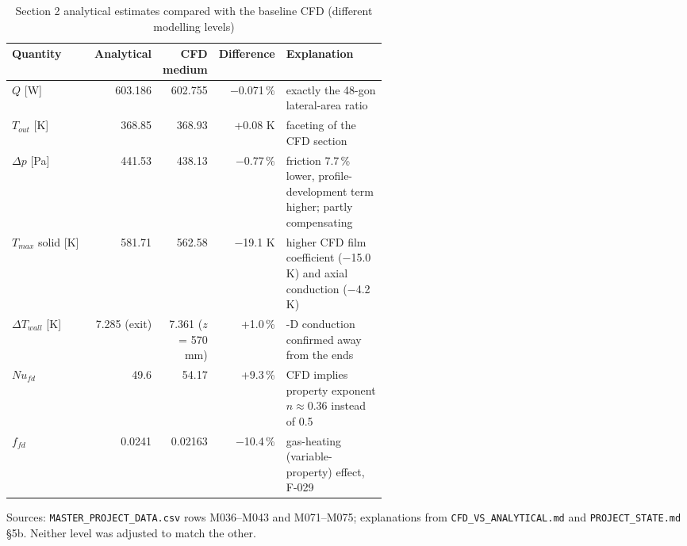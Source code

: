 \begin{table}[htbp]
\centering
\footnotesize
\caption{Section 2 analytical estimates compared with the baseline CFD (different modelling levels)}
\label{tab:anvscfd}
\begin{tabular}{>{\raggedright\arraybackslash}p{0.25\linewidth}rrr>{\raggedright\arraybackslash}p{0.30\linewidth}}
\toprule
Quantity & Analytical & CFD medium & Difference & Explanation \\
\midrule
$Q$ [W] & 603.186 & 602.755 & $-$0.071\,\% & exactly the 48-gon lateral-area ratio \\
$T_{out}$ [K] & 368.85 & 368.93 & +0.08 K & faceting of the CFD section \\
$\Delta p$ [Pa] & 441.53 & 438.13 & $-$0.77\,\% & friction 7.7\,\% lower, profile-development term higher; partly compensating \\
$T_{max}$ solid [K] & 581.71 & 562.58 & $-$19.1 K & higher CFD film coefficient ($-$15.0 K) and axial conduction ($-$4.2 K) \\
$\Delta T_{wall}$ [K] & 7.285 (exit) & 7.361 ($z$ = 570 mm) & +1.0\,\% & 1-D conduction confirmed away from the ends \\
$Nu_{fd}$ & 49.6 & 54.17 & +9.3\,\% & CFD implies property exponent $n \approx 0.36$ instead of 0.5 \\
$f_{fd}$ & 0.0241 & 0.02163 & $-$10.4\,\% & gas-heating (variable-property) effect, F-029 \\
\bottomrule
\end{tabular}
\par\smallskip\parbox{\linewidth}{\footnotesize\raggedright Sources: \texttt{MASTER\_PROJECT\_DATA.csv} rows M036--M043 and M071--M075; explanations from \texttt{CFD\_VS\_ANALYTICAL.md} and \texttt{PROJECT\_STATE.md} \S5b. Neither level was adjusted to match the other.}
\end{table}
